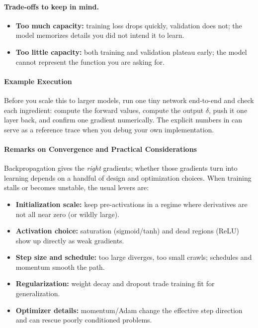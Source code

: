 \paragraph{Trade-offs to keep in mind.}
\begin{itemize}
    \item \textbf{Too much capacity:} training loss drops quickly, validation does not; the model memorizes details you did not intend it to learn.
    \item \textbf{Too little capacity:} both training and validation plateau early; the model cannot represent the function you are asking for.
\end{itemize}

\paragraph{Example Execution}

Before you scale this to larger models, run one tiny network end-to-end and check each ingredient: compute the forward values, compute the output \(\delta\), push it one layer back, and confirm one gradient numerically. The explicit numbers in  can serve as a reference trace when you debug your own implementation.

\paragraph{Remarks on Convergence and Practical Considerations}

Backpropagation gives the \emph{right} gradients; whether those gradients turn into learning depends on a handful of design and optimization choices. When training stalls or becomes unstable, the usual levers are:
\begin{itemize}
    \item \textbf{Initialization scale:} keep pre\hyp{}activations in a regime where derivatives are not all near zero (or wildly large).
    \item \textbf{Activation choice:} saturation (sigmoid/tanh) and dead regions (ReLU) show up directly as weak gradients.
    \item \textbf{Step size and schedule:} too large diverges, too small crawls; schedules and momentum smooth the path.
    \item \textbf{Regularization:} weight decay and dropout trade training fit for generalization.
    \item \textbf{Optimizer details:} momentum/Adam change the effective step direction and can rescue poorly conditioned problems.
\end{itemize}

